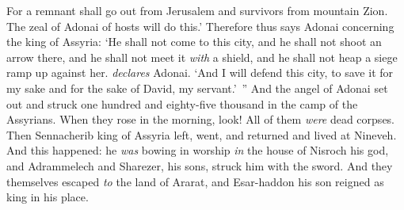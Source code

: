 \begin{biblechapter}
\verse For a remnant shall go out from Jerusalem 
and survivors from mountain Zion. The zeal of Adonai of hosts will do this.’
\verse Therefore thus says Adonai concerning the king of Assyria:
\verse ‘He shall not come to this city, 
and he shall not shoot an arrow there, 
and he shall not meet it \textit{with} a shield, 
and he shall not heap a siege ramp up against her. \textit{declares} Adonai.
\verse ‘And I will defend this city, to save it for my sake and for the sake of David, my servant.’ ”
 And the angel of Adonai set out and struck one hundred and eighty-five thousand in the camp of the Assyrians. When they rose in the morning, look! All of them \textit{were} dead corpses.
\verse Then Sennacherib king of Assyria left, went, and returned and lived at Nineveh.
\verse And this happened: he \textit{was} bowing in worship \textit{in} the house of Nisroch his god, and Adrammelech and Sharezer, his sons, struck him with the sword. And they themselves escaped \textit{to} the land of Ararat, and Esar-haddon his son reigned as king in his place.
\end{biblechapter}

